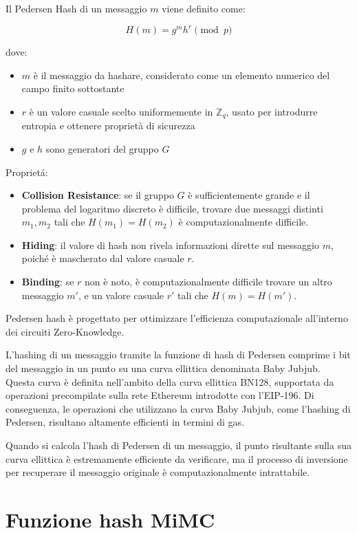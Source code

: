 Il Pedersen Hash di un messaggio  $m$ viene definito come:

$$H(m)=g^mh^r\pmod{p}$$

dove:

\begin{itemize}
    \item $m$ è il messaggio da hashare, considerato come un elemento numerico del campo finito sottostante
    \item $r$ è un valore casuale scelto uniformemente in $\mathbb{Z}_q$, usato per introdurre entropia e ottenere proprietà di sicurezza
    \item $g$ e $h$ sono generatori del gruppo $G$ \\
\end{itemize}

Proprietá:
\begin{itemize}
    \item \textbf{Collision Resistance}: se il gruppo $G$ è sufficientemente grande e il problema del logaritmo discreto è difficile, trovare due messaggi distinti $m_1,m_2$ tali che $H(m_1)=H(m_2)$ è computazionalmente difficile.
    \item \textbf{Hiding}:  il valore di hash non rivela informazioni dirette sul messaggio  $m$, poiché è mascherato dal valore casuale  $r$.
    \item \textbf{Binding}: se $r$ non è noto, è computazionalmente difficile trovare un altro messaggio $m'$, e un valore casuale $r'$ tali che $H(m)=H(m')$.
\end{itemize}

Pedersen hash è progettato per ottimizzare l'efficienza computazionale all'interno dei circuiti Zero-Knowledge.

L'hashing di un messaggio tramite la funzione di hash di Pedersen comprime i bit del messaggio in un punto su una curva ellittica denominata Baby Jubjub. Questa curva è definita nell'ambito della curva ellittica BN128, supportata da operazioni precompilate sulla rete Ethereum introdotte con l'EIP-196. Di conseguenza, le operazioni che utilizzano la curva Baby Jubjub, come l'hashing di Pedersen, risultano altamente efficienti in termini di gas.  

Quando si calcola l'hash di Pedersen di un messaggio, il punto risultante sulla sua curva ellittica è estremamente efficiente da verificare, ma il processo di inversione per recuperare il messaggio originale è computazionalmente intrattabile.

\section{Funzione hash MiMC}

